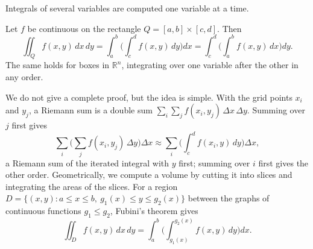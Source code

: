 Integrals of several variables are computed one variable at a time.

\begin{theorem}[Fubini]\label{L3-thm:fubini}
    Let $f$ be continuous on the rectangle $Q = [a, b] \times [c, d]$. Then
    \[\iint_Q f(x, y)\, dx\, dy = \int_a^b \bigg(\int_c^d f(x, y)\, dy\bigg) dx = \int_c^d \bigg(\int_a^b f(x, y)\, dx\bigg) dy.\]
    The same holds for boxes in $\mathbb{R}^n$, integrating over one variable after the other in any order.
\end{theorem}

We do not give a complete proof, but the idea is simple. With the grid points $x_i$ and $y_j$, a Riemann sum is a double sum $\sum_i\sum_j f(x_i, y_j)\,\Delta x\,\Delta y$. Summing over $j$ first gives
\[\sum_i \Big(\sum_j f(x_i, y_j)\,\Delta y\Big)\Delta x \approx \sum_i \bigg(\int_c^d f(x_i, y)\, dy\bigg)\Delta x,\]
a Riemann sum of the iterated integral with $y$ first; summing over $i$ first gives the other order. Geometrically, we compute a volume by cutting it into slices and integrating the areas of the slices. For a region $D = \{(x, y) : a \leq x \leq b, \ g_1(x) \leq y \leq g_2(x)\}$ between the graphs of continuous functions $g_1 \leq g_2$, Fubini's theorem gives
\[\iint_D f(x, y)\, dx\, dy = \int_a^b \bigg(\int_{g_1(x)}^{g_2(x)} f(x, y)\, dy\bigg) dx.\]

